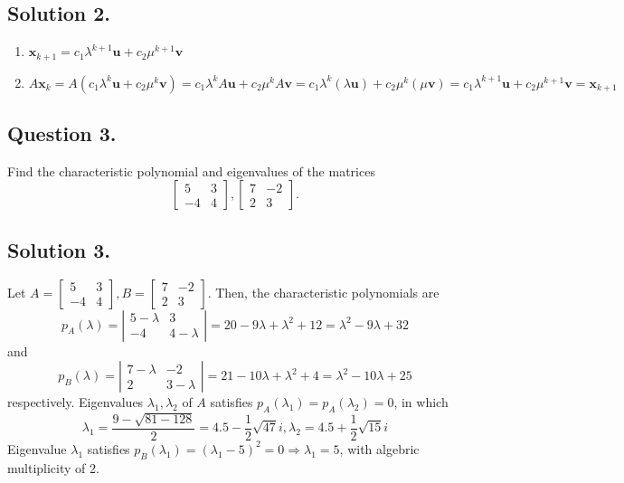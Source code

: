 \documentclass{article}
\begin{document}
\subsection*{Solution 2.}
\begin{enumerate} [label=(\arabic*)]
    \item $\mathbf{x}_{k+1}=c_1\lambda^{k+1}\mathbf{u}+c_2\mu^{k+1}\mathbf{v}$
    \item $A\mathbf{x}_k=A(c_1\lambda^k\mathbf{u}+c_2\mu^k\mathbf{v})=c_1\lambda^kA\mathbf{u}+c_2\mu^kA\mathbf{v}=c_1\lambda^k(\lambda\mathbf{u})+c_2\mu^k(\mu\mathbf{v})=c_1\lambda^{k+1}\mathbf{u}+c_2\mu^{k+1}\mathbf{v}=\mathbf{x}_{k+1}$
\end{enumerate}
\subsection*{Question 3.}
Find the characteristic polynomial and eigenvalues of the matrices
\[\left[\begin{array}{rr}
5 & 3 \\
-4 & 4
\end{array}\right],\left[\begin{array}{rr}
7 & -2 \\
2 & 3
\end{array}\right].\]
\subsection*{Solution 3.}
Let $A=\left[\begin{array}{rr}
5 & 3 \\
-4 & 4
\end{array}\right],B=\left[\begin{array}{rr}
7 & -2 \\
2 & 3
\end{array}\right]$. Then, the characteristic polynomials are
\[p_A(\lambda)=\left\vert\begin{array}{rr}
5-\lambda & 3 \\
-4 & 4-\lambda
\end{array}\right\vert=20-9\lambda+\lambda^2+12=\lambda^2-9\lambda+32\]
and
\[p_B(\lambda)=\left\vert\begin{array}{rr}
7-\lambda & -2 \\
2 & 3-\lambda
\end{array}\right\vert=21-10\lambda+\lambda^2+4=\lambda^2-10\lambda+25\]
respectively.\newline
Eigenvalues $\lambda_1,\lambda_2$ of $A$ satisfies $p_A(\lambda_1)=p_A(\lambda_2)=0$, in which 
\[\lambda_1=\frac{9-\sqrt{81-128}}{2}=4.5-\frac{1}{2}\sqrt{47}i,\lambda_2=4.5+\frac{1}{2}\sqrt{15}i\]
Eigenvalue $\lambda_1$ satisfies $p_B(\lambda_1)=(\lambda_1-5)^2=0\Rightarrow \lambda_1=5$, with algebric multiplicity of 2.
\end{document}

